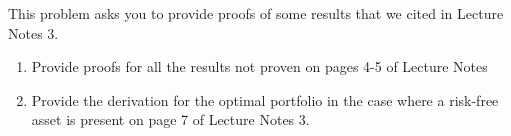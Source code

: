 This problem asks you to provide proofs of some results that we cited in Lecture Notes 3.

\begin{enumerate}
    \item Provide proofs for all the results not proven on pages 4-5 of Lecture Notes
    \item Provide the derivation for the optimal portfolio in the case where a risk-free asset is present on page 7 of Lecture Notes 3.
\end{enumerate}
